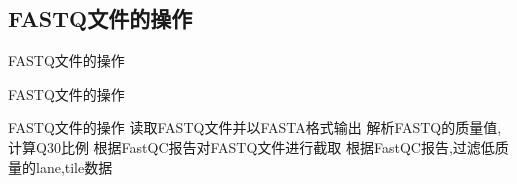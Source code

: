 \subsection{FASTQ文件的操作}
\begin{frame}[standout] FASTQ文件的操作 \end{frame}
\begin{frame}{FASTQ文件的操作}
    \begin{myoutline}
        \1 FASTQ文件的操作
            \2 读取FASTQ文件并以FASTA格式输出
            \2 解析FASTQ的质量值,计算Q30比例
            \2 根据FastQC报告对FASTQ文件进行截取
            \2 根据FastQC报告,过滤低质量的lane,tile数据
    \end{myoutline}
\end{frame}
